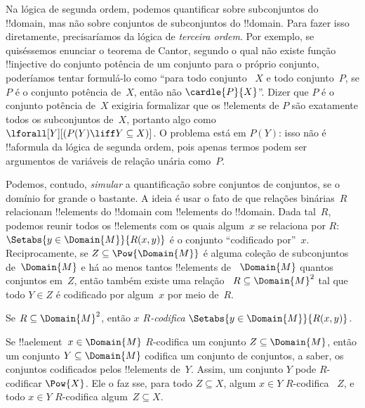 \documentclass[../../../include/open-logic-section]{subfiles}
\begin{document}


\begin{explain}
Na lógica de segunda ordem, podemos quantificar sobre subconjuntos do
!!{domain}, mas não sobre conjuntos de subconjuntos do !!{domain}. Para
fazer isso diretamente, precisaríamos da lógica de \emph{terceira ordem}.
Por exemplo, se quiséssemos enunciar o teorema de Cantor, segundo o qual não
existe função !!{injective} do conjunto potência de um conjunto para o
próprio conjunto, poderíamos tentar formulá-lo como ``para todo conjunto
~$X$ e todo conjunto~$P$, se $P$ é o conjunto potência de~$X$, então não
$\cardle{P}{X}$''. Dizer que $P$ é o conjunto potência de~$X$ exigiria
formalizar que os !!{element}s de $P$ são exatamente todos os subconjuntos
de~$X$, portanto algo como $\lforall[Y][(P(Y)
  \liff Y \subseteq X)]$. O problema está em $P(Y)$: isso não é
!!a{formula} da lógica de segunda ordem, pois apenas termos podem ser
argumentos de variáveis de relação unária como~$P$.

Podemos, contudo, \emph{simular} a quantificação sobre conjuntos de
conjuntos, se o domínio for grande o bastante. A ideia é usar o fato de que
relações binárias~$R$ relacionam !!{element}s do !!{domain} com
!!{element}s do !!{domain}. Dada tal~$R$, podemos reunir todos os
!!{element}s com os quais algum~$x$ se relaciona por $R$:
$\Setabs{y \in \Domain{M}}{R(x,y)}$ é o conjunto ``codificado por''~$x$.
Reciprocamente, se $Z \subseteq \Pow{\Domain{M}}$ é alguma coleção de
subconjuntos de~$\Domain{M}$ e há ao menos tantos !!{element}s de
~$\Domain{M}$ quantos conjuntos em~$Z$, então também existe uma relação
~$R \subseteq \Domain{M}^2$ tal que todo $Y \in Z$ é codificado por
algum~$x$ por meio de~$R$.
\end{explain}

\begin{defn}
Se $R \subseteq \Domain{M}^2$, então \emph{$x$ $R$-codifica}
$\Setabs{y \in \Domain{M}}{R(x, y)}$.
\end{defn}

Se !!a{element}~$x \in \Domain{M}$ $R$-codifica um conjunto
$Z \subseteq \Domain{M}$, então um conjunto $Y \subseteq \Domain{M}$
codifica um conjunto de conjuntos, a saber, os conjuntos codificados pelos
!!{element}s de~$Y$. Assim, um conjunto $Y$ pode $R$-codificar $\Pow{X}$.
Ele o faz sse, para todo $Z \subseteq X$, algum $x \in Y$ $R$-codifica
~$Z$, e todo $x \in Y$ $R$-codifica algum~$Z \subseteq X$.
\end{document}
